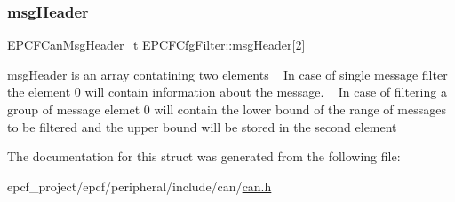 \subsubsection{\texorpdfstring{msg\+Header}{msgHeader}}
{\footnotesize\ttfamily \mbox{\hyperlink{structEPCFCanMsgHeader__t}{E\+P\+C\+F\+Can\+Msg\+Header\+\_\+t}} E\+P\+C\+F\+Cfg\+Filter\+::msg\+Header\mbox{[}2\mbox{]}}

msg\+Header is an array contatining two elements ~\newline
 In case of single message filter the element 0 will contain information about the message. ~\newline
 In case of filtering a group of message elemet 0 will contain the lower bound of the range of messages to be filtered and the upper bound will be stored in the second element 

The documentation for this struct was generated from the following file\+:\begin{DoxyCompactItemize}
\item 
epcf\+\_\+project/epcf/peripheral/include/can/\mbox{\hyperlink{can_8h}{can.\+h}}\end{DoxyCompactItemize}
